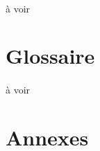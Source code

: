 \documentclass[a4paper,12pt]{extarticle}
\begin{document}
\paragraph{}
à voir\\

\section{Glossaire}

\paragraph{}
à voir\\

\clearpage

\section{Annexes}

\begin{center}
\end{center}
\end{document}
